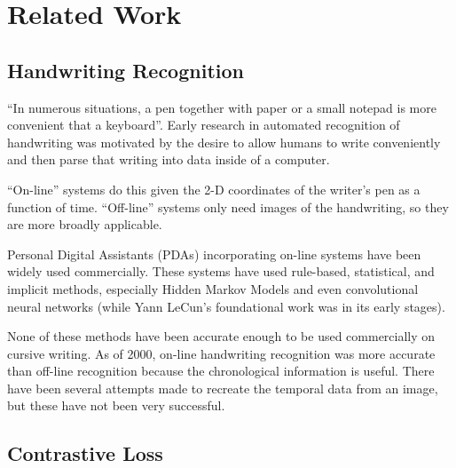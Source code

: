 \section{Related Work}\label{sec:related_work}


\subsection{Handwriting Recognition} %

``In numerous situations, a pen together with paper or a small notepad is more convenient that a keyboard''\cite{handwriting_survey}.
Early research in automated recognition of handwriting was motivated by the desire to allow humans to write conveniently and then parse that writing into data inside of a computer.

``On-line'' systems do this given the 2-D coordinates of the writer's pen as a function of time.%
``Off-line'' systems only need images of the handwriting, so they are more broadly applicable\cite{handwriting_survey}.

Personal Digital Assistants (PDAs) incorporating on-line systems have been widely used commercially.
These systems have used rule-based, statistical, and implicit methods\cite{handwriting_survey}, especially Hidden Markov Models and even convolutional neural networks\cite{389575} (while Yann LeCun's foundational work was in its early stages\cite{mnist}).

None of these methods have been accurate enough to be used commercially on cursive writing\cite{handwriting_survey}.
As of 2000, on-line handwriting recognition was more accurate than off-line recognition because the chronological information is useful\cite{handwriting_survey}.
There have been several attempts made to recreate the temporal data from an image, but these have not been very successful\cite{handwriting_survey}.



\subsection{Contrastive Loss}\label{sec:contrastive_loss}

